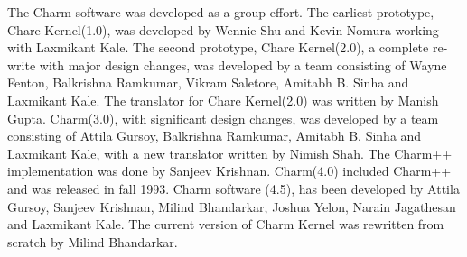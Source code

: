 \vspace*{2.5in}
\Large
The Charm software was developed as a group effort.
The earliest prototype, Chare Kernel(1.0), was developed by Wennie Shu and Kevin
Nomura working with Laxmikant Kale. 
The second prototype, Chare Kernel(2.0), 
a complete re-write with major design changes,
was developed by a team consisting of
Wayne Fenton, Balkrishna Ramkumar, Vikram Saletore, Amitabh B. Sinha
and Laxmikant Kale. The translator for Chare Kernel(2.0) was written by
Manish Gupta.
Charm(3.0), with significant design changes, was developed by a team
consisting of Attila Gursoy, Balkrishna Ramkumar, Amitabh B.  Sinha and
Laxmikant Kale, with a new translator written by Nimish Shah.  
The Charm++ implementation was done by Sanjeev Krishnan.
Charm(4.0) included Charm++ and was released in fall 1993. 
Charm software (4.5), has been developed by
Attila Gursoy, Sanjeev Krishnan, Milind Bhandarkar, Joshua Yelon, Narain
Jagathesan and Laxmikant Kale.
The current version of Charm Kernel was rewritten from scratch by
Milind Bhandarkar.
\normalsize
